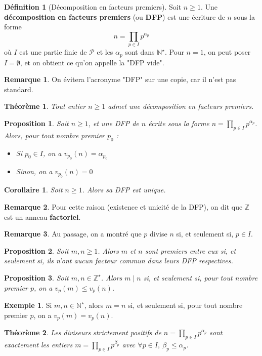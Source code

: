 \documentclass[french]{book}
\newcommand{\N}{\mathbb{N}}
\newcommand{\Z}{\mathbb{Z}}
\newcommand{\st}{^\star}
\theoremstyle{plain}
\newtheorem{thm}{Théorème}[chapter]
\newtheorem{prop}{Proposition}[chapter]
\newtheorem{cor}{Corollaire}[chapter]
\theoremstyle{definition}
\newtheorem{dfn}{Définition}[chapter]
\newtheorem{exa}{Exemple}[chapter]
\newtheorem{rmq}{Remarque}[chapter]
\theoremstyle{remark}
\begin{document}
\begin{dfn}[Décomposition en facteurs premiers]
	Soit $n\geqslant1$. Une \textbf{décomposition en facteurs premiers} (ou \textbf{DFP}) est une écriture de $n$ sous la forme $$n=\prod_{p\in I}p^{\alpha_p}$$ où $I$ est une partie finie de $\mathcal{P}$ et les $\alpha_p$ sont dans $\N\st$. Pour $n=1$, on peut poser $I=\emptyset$, et on obtient ce qu'on appelle la "DFP vide".
\end{dfn}
\begin{rmq}
	On évitera l'acronyme "DFP" sur une copie, car il n'est pas standard.
\end{rmq}
\begin{thm}
	Tout entier $n\geqslant1$ admet une décomposition en facteurs premiers.
\end{thm}
\begin{prop}
	Soit $n\geqslant1$, et une DFP de $n$ écrite sous la forme $\displaystyle n=\prod_{p\in I}p^{\alpha_p}$. Alors, pour tout nombre premier $p_0$ : 
	\begin{itemize}
		\item Si $p_0\in I$, on a $v_{p_0}(n)=\alpha_{p_0}$
		\item Sinon, on a $v_{p_0}(n)=0$
	\end{itemize}
\end{prop}
\begin{cor}
	Soit $n\geqslant1$. Alors sa DFP est unique.
\end{cor}
\begin{rmq}
	Pour cette raison (existence et unicité de la DFP), on dit que $\Z$ est un anneau \textbf{factoriel}.
\end{rmq}
\begin{rmq}
	Au passage, on a montré que $p$ divise $n$ si, et seulement si, $p\in I$.
\end{rmq}
\begin{prop}
	Soit $m,n\geqslant1$. Alors $m$ et $n$ sont premiers entre eux si, et seulement si, ils n'ont aucun facteur commun dans leurs DFP respectives.
\end{prop}
\begin{prop}
	Soit $m,n\in\Z\st$. Alors $m\mid n$ si, et seulement si, pour tout nombre premier $p$, on a $v_p(m)\leqslant v_p(n)$.
\end{prop}
\begin{exa}
	Si $m,n\in\N\st$, alors $m=n$ si, et seulement si, pour tout nombre premier $p$, on a $v_p(m)=v_p(n)$.
\end{exa}
\begin{thm}
	Les diviseurs strictement positifs de $\displaystyle n=\prod_{p\in I}p^{\alpha_p}$ sont exactement les entiers $\displaystyle m=\prod_{p\in I}p^{\beta_p}$ avec $\forall p \in I,\ \beta_p\leqslant\alpha_p$.
\end{thm}
\end{document}
